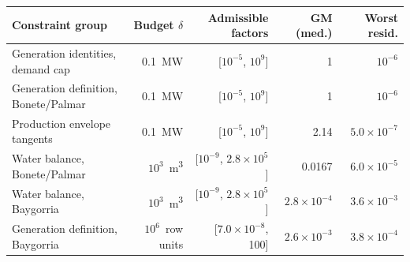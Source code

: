 \begin{tabular}{lrrrr}
\toprule
Constraint group & Budget $\delta$ & Admissible factors & GM (med.) & Worst resid. \\
\midrule
Generation identities, demand cap & 0.1~MW & [$10^{-5}$, $10^{9}$] & 1 & $10^{-6}$ \\
Generation definition, Bonete/Palmar & 0.1~MW & [$10^{-5}$, $10^{9}$] & 1 & $10^{-6}$ \\
Production envelope tangents & 0.1~MW & [$10^{-5}$, $10^{9}$] & 2.14 & $5.0\times10^{-7}$ \\
Water balance, Bonete/Palmar & $10^{3}$~m\textsuperscript{3} & [$10^{-9}$, $2.8\times10^{5}$] & 0.0167 & $6.0\times10^{-5}$ \\
Water balance, Baygorria & $10^{3}$~m\textsuperscript{3} & [$10^{-9}$, $2.8\times10^{5}$] & $2.8\times10^{-4}$ & $3.6\times10^{-3}$ \\
Generation definition, Baygorria & $10^{6}$~row units & [$7.0\times10^{-8}$, 100] & $2.6\times10^{-3}$ & $3.8\times10^{-4}$ \\
\bottomrule
\end{tabular}
